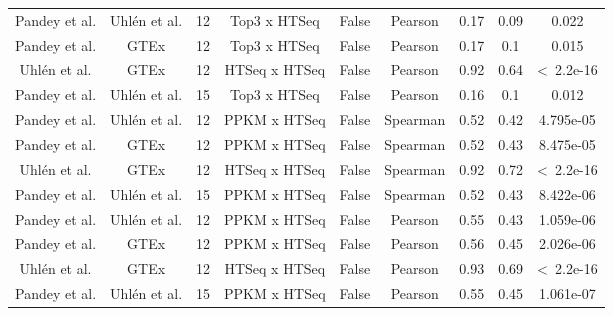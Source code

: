 \begin{landscape}
\begin{longtable}{@{}ccccccccc@{}}
Pandey et al. & Uhlén et al. & 12 & Top3 x HTSeq & False & Pearson & 0.17 & 0.09 & 0.022 \\
Pandey et al. & GTEx & 12 & Top3 x HTSeq & False & Pearson & 0.17 & 0.1 & 0.015 \\
{\color[HTML]{9B9B9B} Uhlén et al.} & {\color[HTML]{9B9B9B} GTEx} & {\color[HTML]{9B9B9B} 12} & {\color[HTML]{9B9B9B} HTSeq x HTSeq} & {\color[HTML]{9B9B9B} False} & {\color[HTML]{9B9B9B} Pearson} & {\color[HTML]{9B9B9B} 0.92} & {\color[HTML]{9B9B9B} 0.64} & {\color[HTML]{9B9B9B} \textless\ 2.2e-16} \\
Pandey et al. & Uhlén et al. & 15 & Top3 x HTSeq & False & Pearson & 0.16 & 0.1 & 0.012 \\
Pandey et al. & Uhlén et al. & 12 & PPKM x HTSeq & False & Spearman & 0.52 & 0.42 & 4.795e-05 \\
Pandey et al. & GTEx & 12 & PPKM x HTSeq & False & Spearman & 0.52 & 0.43 & 8.475e-05 \\
{\color[HTML]{9B9B9B} Uhlén et al.} & {\color[HTML]{9B9B9B} GTEx} & {\color[HTML]{9B9B9B} 12} & {\color[HTML]{9B9B9B} HTSeq x HTSeq} & {\color[HTML]{9B9B9B} False} & {\color[HTML]{9B9B9B} Spearman} & {\color[HTML]{9B9B9B} 0.92} & {\color[HTML]{9B9B9B} 0.72} & {\color[HTML]{9B9B9B} \textless\ 2.2e-16} \\
Pandey et al. & Uhlén et al. & 15 & PPKM x HTSeq & False & Spearman & 0.52 & 0.43 & 8.422e-06 \\
Pandey et al. & Uhlén et al. & 12 & PPKM x HTSeq & False & Pearson & 0.55 & 0.43 & 1.059e-06 \\
Pandey et al. & GTEx & 12 & PPKM x HTSeq & False & Pearson & 0.56 & 0.45 & 2.026e-06 \\
{\color[HTML]{9B9B9B} Uhlén et al.} & {\color[HTML]{9B9B9B} GTEx} & {\color[HTML]{9B9B9B} 12} & {\color[HTML]{9B9B9B} HTSeq x HTSeq} & {\color[HTML]{9B9B9B} False} & {\color[HTML]{9B9B9B} Pearson} & {\color[HTML]{9B9B9B} 0.93} & {\color[HTML]{9B9B9B} 0.69} & {\color[HTML]{9B9B9B} \textless\ 2.2e-16} \\
Pandey et al. & Uhlén et al. & 15 & PPKM x HTSeq & False & Pearson & 0.55 & 0.45 & 1.061e-07 \\* \bottomrule
\end{longtable}
\end{landscape}

\pagestyle{scrheadings}
